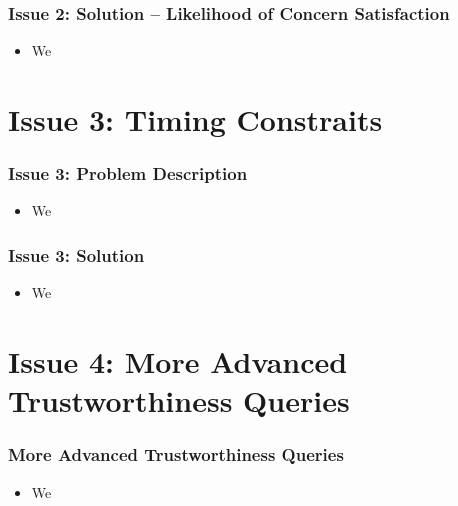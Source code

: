 \documentclass{beamer}
\begin{document}
\begin{frame}[fragile]
	\frametitle{Issue 2: Solution -- Likelihood of Concern Satisfaction}
	\begin{itemize}
		\item We 	   
	\end{itemize}
\end{frame}


\section{Issue 3: Timing Constraits} 
\begin{frame}
	\frametitle{Issue 3: Problem Description}
	\begin{itemize}
		\item We 	   
	\end{itemize}
\end{frame}

\begin{frame}[fragile]
	\frametitle{Issue 3: Solution}
	\begin{itemize}
		\item We 	   
	\end{itemize}
\end{frame}

\section{Issue 4: More Advanced Trustworthiness Queries} 
\begin{frame}
	\frametitle{More Advanced Trustworthiness Queries}
	\begin{itemize}
		\item We 	   
	\end{itemize}
\end{frame}


%


        
\end{document}
